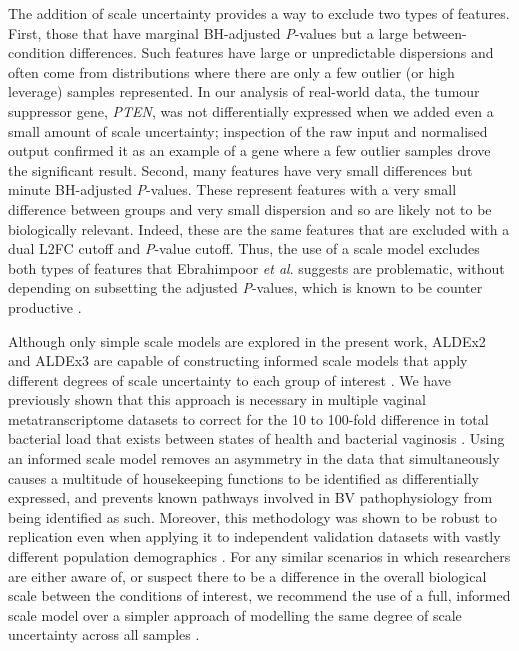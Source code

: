 \documentclass[10pt,letterpaper]{article}
\begin{document}
The addition of scale uncertainty provides a way to exclude two types of features. First, those that have marginal BH-adjusted \textit{P}-values but a large between-condition differences. Such features have large or unpredictable dispersions and often come from distributions where there are only a few outlier (or high leverage) samples represented. In our analysis of real-world data, the tumour suppressor gene, \textit{PTEN}, was not differentially expressed when we added even a small amount of scale uncertainty; inspection of the raw input and normalised output confirmed it as an example of a gene where a few outlier samples drove the significant result. Second, many features have very small differences but minute BH-adjusted \textit{P}-values. These represent features with a very small difference between groups and very small dispersion and so are likely not to be biologically relevant. Indeed, these are the same features that are excluded with a dual L2FC cutoff and \textit{P}-value cutoff. Thus, the use of a scale model excludes both types of features that Ebrahimpoor \textit{et al}. \cite{ebrahimpoor_inflated_2021} suggests are problematic, without depending on subsetting the adjusted \textit{P}-values, which is known to be counter productive \cite{Goeman:2014aa, ebrahimpoor_inflated_2021}.

Although only simple scale models are explored in the present work, ALDEx2 and ALDEx3 are capable of constructing informed scale models that apply different degrees of scale uncertainty to each group of interest \cite{nixon_scale_2024, nixon_incorporating_2025}. We have previously shown\cite{dos_santos_vaginal_2024, dos_santos_incorporating_2026} that this approach is necessary in multiple vaginal metatranscriptome datasets to correct for the 10 to 100-fold difference in total bacterial load that exists between states of health and bacterial vaginosis \cite{zozaya-hinchliffe_quantitative_2010}. Using an informed scale model removes an asymmetry in the data that simultaneously causes a multitude of housekeeping functions to be identified as differentially expressed, and prevents known pathways involved in BV pathophysiology from being identified as such. Moreover, this methodology was shown to be robust to replication even when applying it to independent validation datasets with vastly different population demographics \cite{dos_santos_vaginal_2024}. For any similar scenarios in which researchers are either aware of, or suspect there to be a difference in the overall biological scale between the conditions of interest, we recommend the use of a full, informed scale model over a simpler approach of modelling the same degree of scale uncertainty across all samples \cite{dos_santos_incorporating_2026}.
\end{document}
